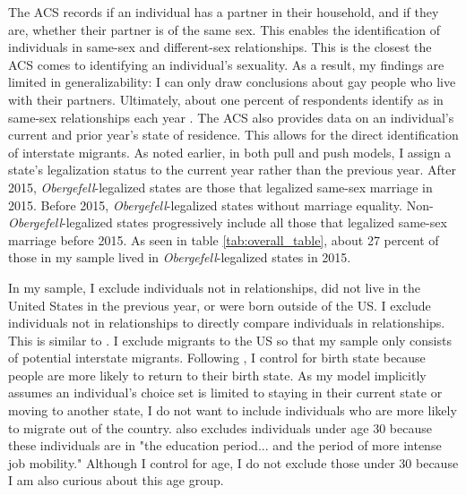 \documentclass[12pt,letterpaper]{article}
\begin{document}
The ACS records if an individual has a partner in their household, and if they are, whether their partner is of the same sex. This enables the identification of individuals in same-sex and different-sex relationships. This is the closest the ACS comes to identifying an individual's sexuality. As a result, my findings are limited in generalizability: I can only draw conclusions about gay people who live with their partners. Ultimately, about one percent of respondents identify as in same-sex relationships each year \citep{28}. The ACS also provides data on an individual's current and prior year's state of residence. This allows for the direct identification of interstate migrants. As noted earlier, in both pull and push models, I assign a state's legalization status to the current year rather than the previous year. After 2015, \textit{Obergefell}-legalized states are those that legalized same-sex marriage in 2015. Before 2015, \textit{Obergefell}-legalized states without marriage equality. Non-\textit{Obergefell}-legalized states progressively include all those that legalized same-sex marriage before 2015. As seen in table \ref{tab:overall_table}, about 27 percent of those in my sample lived in \textit{Obergefell}-legalized states in 2015.
\FloatBarrier



In my sample, I exclude individuals not in relationships, did not live in the United States in the previous year, or were born outside of the US. I exclude individuals not in relationships to directly compare individuals in relationships. This is similar to \citet{1}. I exclude migrants to the US so that my sample only consists of potential interstate migrants. Following \citet{12}, I control for birth state because people are more likely to return to their birth state. As my model implicitly assumes an individual's choice set is limited to staying in their current state or moving to another state, I do not want to include individuals who are more likely to migrate out of the country. \citet{1} also excludes individuals under age 30 because these individuals are in "the education period... and the period of more intense job mobility." Although I control for age, I do not exclude those under 30 because I am also curious about this age group.
\end{document}

